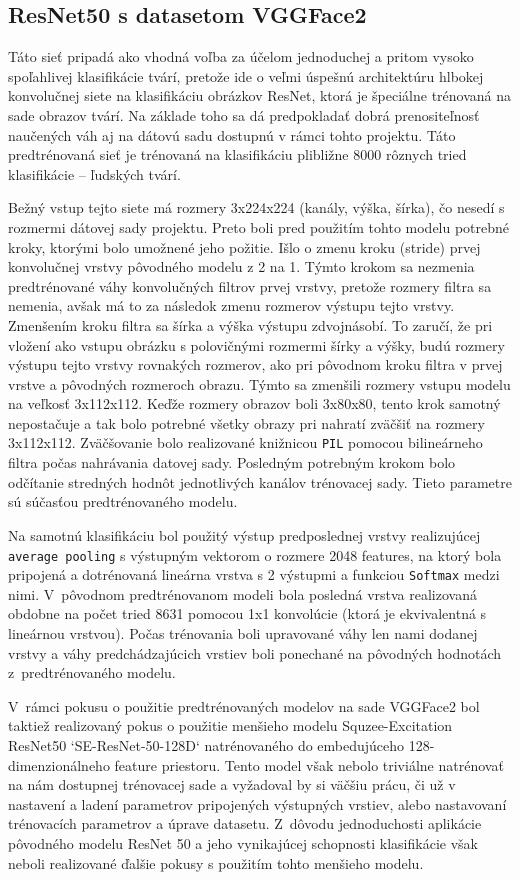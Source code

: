 \documentclass{article}
\begin{document}
\subsection{ResNet50 s datasetom VGGFace2}
Táto sieť pripadá ako vhodná voľba za účelom jednoduchej a pritom vysoko spoľahlivej klasifikácie tvárí, pretože ide o veľmi úspešnú architektúru hlbokej konvolučnej siete na klasifikáciu obrázkov ResNet, ktorá je špeciálne trénovaná na sade obrazov tvárí. Na základe toho sa dá predpokladať dobrá prenositeľnosť naučených váh aj na dátovú sadu dostupnú v rámci tohto projektu. Táto predtrénovaná sieť je trénovaná na klasifikáciu plibližne 8000 rôznych tried klasifikácie -- ľudských tvárí.

Bežný vstup tejto siete má rozmery 3x224x224 (kanály, výška, šírka), čo nesedí s rozmermi dátovej sady projektu. Preto boli pred použitím tohto modelu potrebné kroky, ktorými bolo umožnené jeho požitie. Išlo o zmenu kroku (stride) prvej konvolučnej vrstvy pôvodného modelu z 2 na 1. Týmto krokom sa nezmenia predtrénované váhy konvolučných filtrov prvej vrstvy, pretože rozmery filtra sa nemenia, avšak má to za následok zmenu rozmerov výstupu tejto vrstvy. Zmenšením kroku filtra sa šírka a výška výstupu zdvojnásobí. To zaručí, že pri vložení ako vstupu obrázku s polovičnými rozmermi šírky a výšky, budú rozmery výstupu tejto vrstvy rovnakých rozmerov, ako pri pôvodnom kroku filtra v prvej vrstve a pôvodných rozmeroch obrazu. Týmto sa zmenšili rozmery vstupu modelu na veľkosť 3x112x112. Keďže rozmery obrazov boli 3x80x80, tento krok samotný nepostačuje a tak bolo potrebné všetky obrazy pri nahratí zväčšiť na rozmery 3x112x112. Zväčšovanie bolo realizované knižnicou \texttt{PIL} pomocou bilineárneho filtra počas nahrávania datovej sady. Posledným potrebným krokom bolo odčítanie stredných hodnôt jednotlivých kanálov trénovacej sady. Tieto parametre sú súčasťou predtrénovaného modelu.

Na samotnú klasifikáciu bol použitý výstup predposlednej vrstvy realizujúcej \texttt{average pooling} s výstupným vektorom o rozmere 2048 features, na ktorý bola pripojená a dotrénovaná lineárna vrstva s 2 výstupmi a funkciou \texttt{Softmax} medzi nimi. V~pôvodnom predtrénovanom modeli bola posledná vrstva realizovaná obdobne na počet tried 8631 pomocou 1x1 konvolúcie (ktorá je ekvivalentná s lineárnou vrstvou). Počas trénovania boli upravované váhy len nami dodanej vrstvy a váhy predchádzajúcich vrstiev boli ponechané na pôvodných hodnotách z~predtrénovaného modelu.

V~rámci pokusu o použitie predtrénovaných modelov na sade VGGFace2 bol taktiež realizovaný pokus o použitie menšieho modelu Squzee-Excitation ResNet50 `SE-ResNet-50-128D` natrénovaného do embedujúceho 128-dimenzionálneho feature priestoru. Tento model však nebolo triviálne natrénovať na nám dostupnej trénovacej sade a vyžadoval by si väčšiu prácu, či už v nastavení a ladení parametrov pripojených výstupných vrstiev, alebo nastavovaní trénovacích parametrov a úprave datasetu. Z~dôvodu jednoduchosti aplikácie pôvodného modelu ResNet 50 a jeho vynikajúcej schopnosti klasifikácie však neboli realizované ďalšie pokusy s použitím tohto menšieho modelu.
\end{document}
